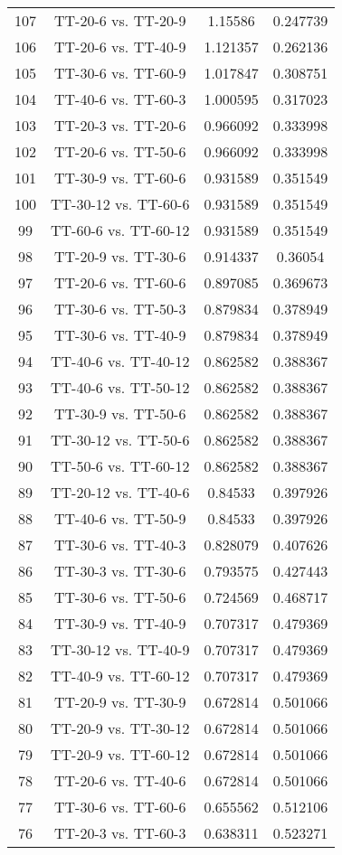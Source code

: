 \documentclass[a4paper,10pt]{article}
\begin{document}
\begin{landscape}
\begin{table}[!htp]
\begin{tabular}{cccc}
107&TT-20-6 vs. TT-20-9&1.15586&0.247739\\
106&TT-20-6 vs. TT-40-9&1.121357&0.262136\\
105&TT-30-6 vs. TT-60-9&1.017847&0.308751\\
104&TT-40-6 vs. TT-60-3&1.000595&0.317023\\
103&TT-20-3 vs. TT-20-6&0.966092&0.333998\\
102&TT-20-6 vs. TT-50-6&0.966092&0.333998\\
101&TT-30-9 vs. TT-60-6&0.931589&0.351549\\
100&TT-30-12 vs. TT-60-6&0.931589&0.351549\\
99&TT-60-6 vs. TT-60-12&0.931589&0.351549\\
98&TT-20-9 vs. TT-30-6&0.914337&0.36054\\
97&TT-20-6 vs. TT-60-6&0.897085&0.369673\\
96&TT-30-6 vs. TT-50-3&0.879834&0.378949\\
95&TT-30-6 vs. TT-40-9&0.879834&0.378949\\
94&TT-40-6 vs. TT-40-12&0.862582&0.388367\\
93&TT-40-6 vs. TT-50-12&0.862582&0.388367\\
92&TT-30-9 vs. TT-50-6&0.862582&0.388367\\
91&TT-30-12 vs. TT-50-6&0.862582&0.388367\\
90&TT-50-6 vs. TT-60-12&0.862582&0.388367\\
89&TT-20-12 vs. TT-40-6&0.84533&0.397926\\
88&TT-40-6 vs. TT-50-9&0.84533&0.397926\\
87&TT-30-6 vs. TT-40-3&0.828079&0.407626\\
86&TT-30-3 vs. TT-30-6&0.793575&0.427443\\
85&TT-30-6 vs. TT-50-6&0.724569&0.468717\\
84&TT-30-9 vs. TT-40-9&0.707317&0.479369\\
83&TT-30-12 vs. TT-40-9&0.707317&0.479369\\
82&TT-40-9 vs. TT-60-12&0.707317&0.479369\\
81&TT-20-9 vs. TT-30-9&0.672814&0.501066\\
80&TT-20-9 vs. TT-30-12&0.672814&0.501066\\
79&TT-20-9 vs. TT-60-12&0.672814&0.501066\\
78&TT-20-6 vs. TT-40-6&0.672814&0.501066\\
77&TT-30-6 vs. TT-60-6&0.655562&0.512106\\
76&TT-20-3 vs. TT-60-3&0.638311&0.523271\\

\end{tabular}
\end{table}
\end{landscape}
\end{document}

